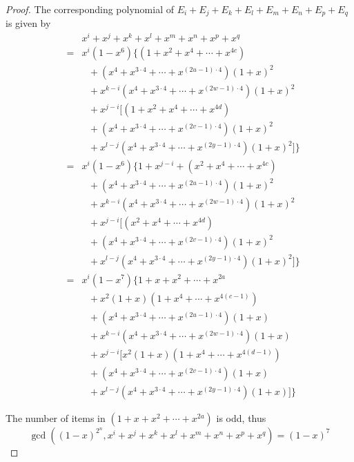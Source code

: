 \documentclass[10pt,conference,twocolumn]{IEEEtran}
\begin{document}
\begin{proof}
The corresponding polynomial of $E_i+E_j+E_k+E_l+E_m+E_n+E_p+E_q$ is
given by
\begin{eqnarray*}
&&x^i+x^j+x^k+x^l+x^m+x^n+x^p+x^q\\
&=&x^i(1-x^{6})\{(1+x^2+x^{4}+\cdots+x^{4c})\\
&&\ \ \  +(x^{4}+x^{3\cdot4}+\cdots +x^{(2u-1)\cdot4})(1+x)^{2}\\
&&\ \ \  +x^{k-i}(x^{4}+x^{3\cdot4}+\cdots
+x^{(2w-1)\cdot4})(1+x)^{2}\\
&&\ \ \ +x^{j-i}[(1+x^2+x^{4}+\cdots+x^{4d})\\
&&\ \ \  +(x^{4}+x^{3\cdot4}+\cdots +x^{(2v-1)\cdot4})(1+x)^{2}\\
&&\ \ \  +x^{l-j}(x^{4}+x^{3\cdot4}+\cdots
+x^{(2y-1)\cdot4})(1+x)^{2}]\}\\
&=&x^i(1-x^{6})\{1+x^{j-i}+(x^2+x^{4}+\cdots+x^{4c})\\
&&\ \ \  +(x^{4}+x^{3\cdot4}+\cdots +x^{(2u-1)\cdot4})(1+x)^{2}\\
&&\ \ \  +x^{k-i}(x^{4}+x^{3\cdot4}+\cdots
+x^{(2w-1)\cdot4})(1+x)^{2}\\
&&\ \ \ +x^{j-i}[(x^2+x^{4}+\cdots+x^{4d})\\
&&\ \ \  +(x^{4}+x^{3\cdot4}+\cdots +x^{(2v-1)\cdot4})(1+x)^{2}\\
&&\ \ \  +x^{l-j}(x^{4}+x^{3\cdot4}+\cdots
+x^{(2y-1)\cdot4})(1+x)^{2}]\}\\
&=&x^i(1-x^{7})\{1+x+x^{2}+\cdots+x^{2a}\\
&&\ \ \ +x^2(1+x)(1+x^{4}+\cdots+x^{4(c-1)})\\
&&\ \ \  +(x^{4}+x^{3\cdot4}+\cdots +x^{(2u-1)\cdot4})(1+x)\\
&&\ \ \  +x^{k-i}(x^{4}+x^{3\cdot4}+\cdots
+x^{(2w-1)\cdot4})(1+x)\\
&&\ \ \ +x^{j-i}[x^2(1+x)(1+x^{4}+\cdots+x^{4(d-1)})\\
&&\ \ \  +(x^{4}+x^{3\cdot4}+\cdots +x^{(2v-1)\cdot4})(1+x)\\
&&\ \ \  +x^{l-j}(x^{4}+x^{3\cdot4}+\cdots
+x^{(2y-1)\cdot4})(1+x)]\}
 \end{eqnarray*}

 The number of items in $(1+x+x^{2}+\cdots+x^{2a})$  is odd, thus
 $$\gcd((1-x)^{2^n},x^i+x^j+x^k+x^l+x^m+x^n+x^p+x^q)=(1-x)^7$$
\end{proof}\



\unitlength=0.26mm
\end{document}

